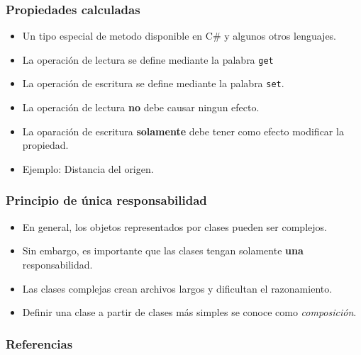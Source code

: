 \documentclass{beamer}
\begin{document}
\begin{frame}
\frametitle{Propiedades calculadas}
    \begin{itemize}
        \item Un tipo especial de metodo disponible en C\# y algunos otros lenguajes.
        \item La operaci\'on de lectura se define mediante la palabra \texttt{get}
        \item La operaci\'on de escritura se define mediante la palabra \texttt{set}.
        \item La operaci\'on de lectura {\bf no} debe causar ningun efecto.
        \item La oparaci\'on de escritura {\bf solamente} debe tener como efecto modificar la propiedad.
        \item Ejemplo: Distancia del origen.
    \end{itemize}
\end{frame}

\begin{frame}
    \frametitle{Principio de \'unica responsabilidad}
    \begin{itemize}
        \item{En general, los objetos representados por clases pueden ser complejos.}
        \item{Sin embargo, es importante que las clases tengan solamente {\bf una} responsabilidad.}
        \item{Las clases complejas crean archivos largos y dificultan el razonamiento.}
        \item{Definir una clase a partir de clases m\'as simples se conoce como \emph{composici\'on}.}
    \end{itemize}
\end{frame}

\begin{frame}
    \frametitle{Referencias}
    
    
\end{frame}
\end{document}
